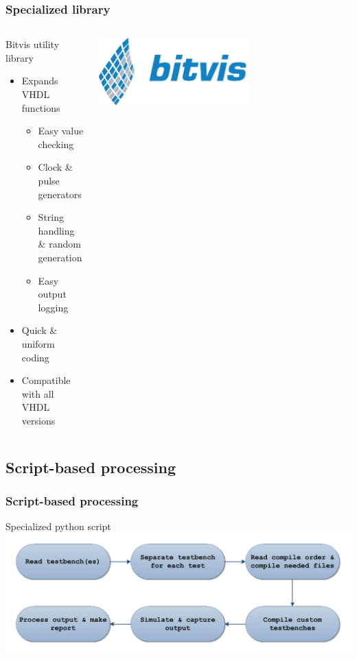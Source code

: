 \documentclass[british,10pt]{beamer}
\begin{document}
\begin{frame}\frametitle{Specialized library}
\begin{columns}
\begin{column}{0.6\textwidth}
Bitvis utility library
\begin{itemize}
\item Expands VHDL functions
\begin{itemize}
\item Easy value checking
\item Clock \& pulse generators
\item String handling \& random generation
\item Easy output logging
\end{itemize}
\item Quick \& uniform coding
\item Compatible with all VHDL versions
\end{itemize}
\end{column}
\includegraphics[width=0.6\textwidth]{images/bitvis.png}
\end{columns}
\end{frame}

\subsection{Script-based processing}

\begin{frame}\frametitle{Script-based processing}
Specialized python script
\vspace{1cm}
\includegraphics[width=\textwidth]{images/Scriptflow.pdf}
\end{frame}
\end{document}
